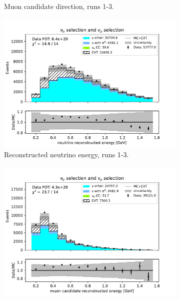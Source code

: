 \begin{figure}[H]
\begin{subfigure}{0.33\linewidth}
        \caption{Muon candidate direction, runs 1-3.}
    \end{subfigure}%
    \begin{subfigure}{0.33\linewidth}
        \captionsetup{width=0.7\linewidth}
        \includegraphics[width=\linewidth]{technote/Sidebands/Figures/NuMuSideband/muon_sideband_neutrino_energy_run123_NUMU_NUMU.pdf}
        \caption{Reconstructed neutrino energy, runs 1-3.}
    \end{subfigure}
    \begin{subfigure}{0.33\linewidth}
        \captionsetup{width=0.7\linewidth}
        \includegraphics[width=\linewidth]{technote/Sidebands/Figures/NuMuSideband/muon_sideband_muon_energy_run4b4c4d5_NUMU_NUMU.pdf}

\end{subfigure}
\end{figure}
